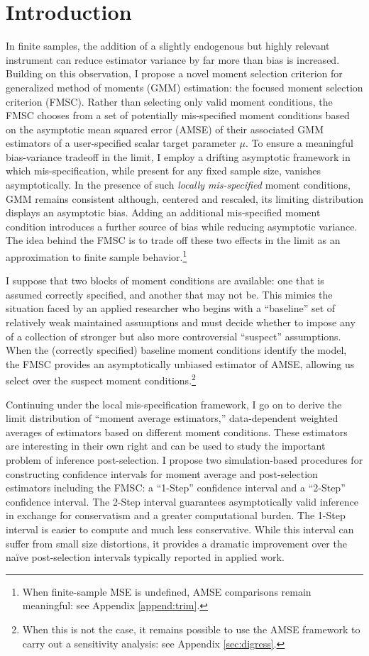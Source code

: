 \section{Introduction}
In finite samples, the addition of a slightly endogenous but highly relevant instrument can reduce estimator variance by far more than bias is increased. 
Building on this observation, I propose a novel moment selection criterion for generalized method of moments (GMM) estimation: the focused moment selection criterion (FMSC). 
Rather than selecting only valid moment conditions, the FMSC chooses from a set of potentially mis-specified moment conditions based on the asymptotic mean squared error (AMSE) of their associated GMM estimators of a user-specified scalar target parameter $\mu$.
To ensure a meaningful bias-variance tradeoff in the limit, I employ a drifting asymptotic framework in which mis-specification, while present for any fixed sample size, vanishes asymptotically.
In the presence of such \emph{locally mis-specified} moment conditions, GMM remains consistent although, centered and rescaled, its limiting distribution displays an asymptotic bias. Adding an additional mis-specified moment condition introduces a further source of bias while reducing asymptotic variance. 
The idea behind the FMSC is to trade off these two effects in the limit as an approximation to finite sample behavior.\footnote{When finite-sample MSE is undefined, AMSE comparisons remain meaningful: see Appendix \ref{append:trim}.}

 
I suppose that two blocks of moment conditions are available: one that is assumed correctly specified, and another that may not be.
This mimics the situation faced by an applied researcher who begins with a ``baseline'' set of relatively weak maintained assumptions and must decide whether to impose any of a collection of stronger but also more controversial ``suspect'' assumptions.
When the (correctly specified) baseline moment conditions identify the model, the FMSC provides an asymptotically unbiased estimator of AMSE, allowing us select over the suspect moment conditions.\footnote{When this is not the case, it remains possible to use the AMSE framework to carry out a sensitivity analysis: see Appendix \ref{sec:digress}.}

Continuing under the local mis-specification framework, I go on to derive the limit distribution of ``moment average estimators,'' data-dependent weighted averages of estimators based on different moment conditions.
These estimators are interesting in their own right and can be used to study the important problem of inference post-selection.
I propose two simulation-based procedures for constructing confidence intervals for moment average and post-selection estimators including the FMSC: a ``1-Step'' confidence interval and a ``2-Step'' confidence interval.
The 2-Step interval guarantees asymptotically valid inference in exchange for conservatism and a greater computational burden.
The 1-Step interval is easier to compute and much less conservative.
While this interval can suffer from small size distortions, it provides a dramatic improvement over the na\"{i}ve post-selection intervals typically reported in applied work.

